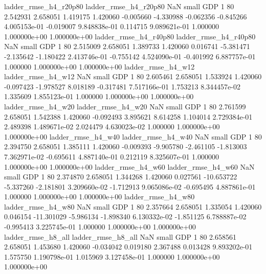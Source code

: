    ladder_rmse_h4_r20p80    ladder_rmse_h4_r20p80                   NaN      small      GDP                 1 80 2.542931       2.658051 1.419175       1.420060   -0.005660     -4.330988     -0.062356    -0.845266   4.005153e-01 -0.019007 9.848838e-01     0.114715   9.089621e-01            1.000000    1.000000e+00        1.000000e+00
   ladder_rmse_h4_r40p80    ladder_rmse_h4_r40p80                   NaN      small      GDP                 1 80 2.515009       2.658051 1.389733       1.420060    0.016741     -5.381471     -2.135642    -1.180422   2.413746e-01 -0.755142 4.524090e-01    -0.401992   6.887757e-01            1.000000    1.000000e+00        1.000000e+00
      ladder_rmse_h4_w12       ladder_rmse_h4_w12                   NaN      small      GDP                 1 80 2.605461       2.658051 1.533924       1.420060   -0.097423     -1.978527      8.018189    -0.317481   7.517166e-01  1.753213 8.344457e-02     1.335609   1.855123e-01            1.000000    1.000000e+00        1.000000e+00
      ladder_rmse_h4_w20       ladder_rmse_h4_w20                   NaN      small      GDP                 1 80 2.761599       2.658051 1.542388       1.420060   -0.092493      3.895621      8.614258     1.104014   2.729384e-01  2.489398 1.489671e-02     2.024479   4.630023e-02            1.000000    1.000000e+00        1.000000e+00
      ladder_rmse_h4_w40       ladder_rmse_h4_w40                   NaN      small      GDP                 1 80 2.394750       2.658051 1.385111       1.420060   -0.009393     -9.905780     -2.461105    -1.813003   7.362971e-02 -0.695611 4.887140e-01     0.212119   8.325607e-01            1.000000    1.000000e+00        1.000000e+00
      ladder_rmse_h4_w60       ladder_rmse_h4_w60                   NaN      small      GDP                 1 80 2.374870       2.658051 1.344268       1.420060    0.027561    -10.653722     -5.337260    -2.181801   3.209660e-02 -1.712913 9.065086e-02    -0.695495   4.887861e-01            1.000000    1.000000e+00        1.000000e+00
      ladder_rmse_h4_w80       ladder_rmse_h4_w80                   NaN      small      GDP                 1 80 2.357664       2.658051 1.335054       1.420060    0.046154    -11.301029     -5.986134    -1.898340   6.130332e-02 -1.851125 6.788887e-02    -0.995413   3.225745e-01            1.000000    1.000000e+00        1.000000e+00
      ladder_rmse_h8_all       ladder_rmse_h8_all                   NaN      small      GDP                 1 80 2.658561       2.658051 1.453680       1.420060   -0.034042      0.019180      2.367488     0.013428   9.893202e-01  1.575750 1.190798e-01     1.015969   3.127458e-01            1.000000    1.000000e+00        1.000000e+00
